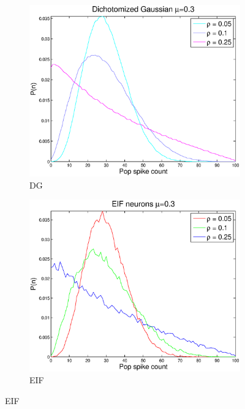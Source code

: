 \documentclass[11pt]{article}
\begin{document}
\newpage

\begin{figure}[H]
	\begin{subfigure}[h]{0.5\textwidth}
	\centering
	\includegraphics[width=\textwidth]{../Figures/DG/DG_Macke_2a_mu_03}
	\caption{DG}
	\label{fig9}
	\end{subfigure}
	\begin{subfigure}[h]{0.5\textwidth}
	\centering
	\includegraphics[width=\textwidth]{../Figures/EIF/EIF_Macke_2a_mu_03}
	\caption{EIF}

\end{subfigure}
\end{figure}
\end{document}
